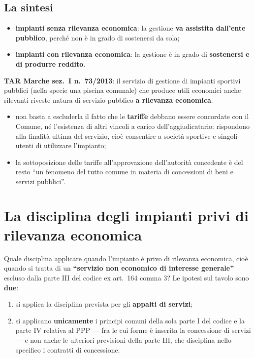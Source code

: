 \subsection{La sintesi}

\begin{itemize}
  \item \textbf{impianti senza rilevanza economica}: la gestione \textbf{va assistita dall'ente
    pubblico}, perché non è in grado di sostenersi da sola;
  \item \textbf{impianti con rilevanza economica}: la gestione è in grado di \textbf{sostenersi e
    di produrre reddito}.
\end{itemize}

\textbf{TAR Marche sez.\ I n.\ 73/2013}: il servizio di gestione di impianti sportivi pubblici
(nella specie una piscina comunale) che produce utili economici anche rilevanti riveste natura di
servizio pubblico \textbf{a rilevanza economica}.

\begin{itemize}
  \item non basta a escluderla il fatto che le \textbf{tariffe} debbano essere concordate con il
    Comune, né l'esistenza di altri vincoli a carico dell'aggiudicatario: rispondono alla finalità
    ultima del servizio, cioè consentire a società sportive e singoli utenti di utilizzare
    l'impianto;
  \item la sottoposizione delle tariffe all'approvazione dell'autorità concedente è del resto
    ``un fenomeno del tutto comune in materia di concessioni di beni e servizi pubblici''.
\end{itemize}

\section{La disciplina degli impianti privi di rilevanza economica}

Quale disciplina applicare quando l'impianto è privo di rilevanza economica, cioè quando si tratta
di un \textbf{``servizio non economico di interesse generale''} escluso dalla parte III del codice
ex art.\ 164 comma 3? Le ipotesi sul tavolo sono \textbf{due}:

\begin{enumerate}
  \item si applica la disciplina prevista per gli \textbf{appalti di servizi};
  \item si applicano \textbf{unicamente} i principi comuni della sola parte I del codice e la
    parte IV relativa al PPP --- fra le cui forme è inserita la concessione di servizi --- e non
    anche le ulteriori previsioni della parte III, che disciplina nello specifico i contratti di
    concessione.
\end{enumerate}

